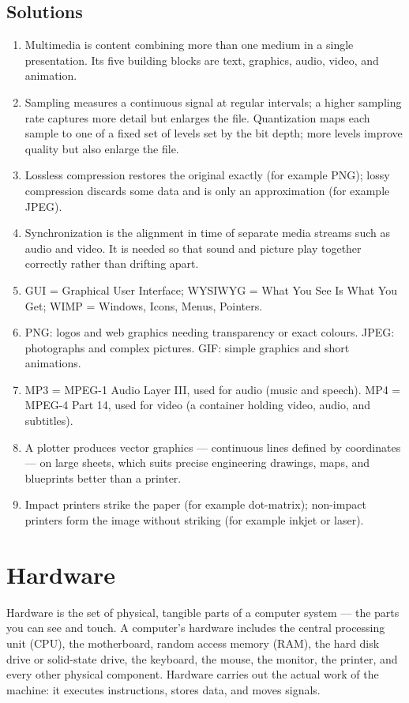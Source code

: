 \subsection*{Solutions}
\begingroup\small
\begin{enumerate}[label=\arabic*.]
  \item Multimedia is content combining more than one medium in a single
    presentation. Its five building blocks are text, graphics, audio, video,
    and animation.
  \item Sampling measures a continuous signal at regular intervals; a higher
    sampling rate captures more detail but enlarges the file. Quantization maps
    each sample to one of a fixed set of levels set by the bit depth; more
    levels improve quality but also enlarge the file.
  \item Lossless compression restores the original exactly (for example PNG);
    lossy compression discards some data and is only an approximation (for
    example JPEG).
  \item Synchronization is the alignment in time of separate media streams such
    as audio and video. It is needed so that sound and picture play together
    correctly rather than drifting apart.
  \item GUI = Graphical User Interface; WYSIWYG = What You See Is What You Get;
    WIMP = Windows, Icons, Menus, Pointers.
  \item PNG: logos and web graphics needing transparency or exact colours.
    JPEG: photographs and complex pictures. GIF: simple graphics and short
    animations.
  \item MP3 = MPEG-1 Audio Layer III, used for audio (music and speech). MP4 =
    MPEG-4 Part 14, used for video (a container holding video, audio, and
    subtitles).
  \item A plotter produces vector graphics --- continuous lines defined by
    coordinates --- on large sheets, which suits precise engineering drawings,
    maps, and blueprints better than a printer.
  \item Impact printers strike the paper (for example dot-matrix); non-impact
    printers form the image without striking (for example inkjet or laser).
\end{enumerate}
\endgroup

\section{Hardware}
Hardware is the set of physical, tangible parts of a computer system --- the
parts you can see and touch. A computer's hardware includes the central
processing unit (CPU), the motherboard, random access memory (RAM), the hard
disk drive or solid-state drive, the keyboard, the mouse, the monitor, the
printer, and every other physical component. Hardware carries out the actual
work of the machine: it executes instructions, stores data, and moves signals.

